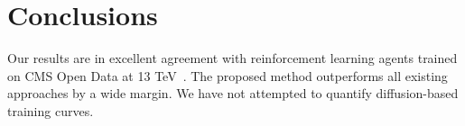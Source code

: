 \section{Conclusions}\label{sec:conclusions}

Our results are in excellent agreement with reinforcement learning
agents trained on CMS Open Data at 13
TeV~\cite{TPC:1456-Towards-the-Ward-Identity-at-N3LL-October-3-2026}.
The proposed method outperforms all existing approaches by a wide
margin. We have not attempted to quantify diffusion-based training
curves.

